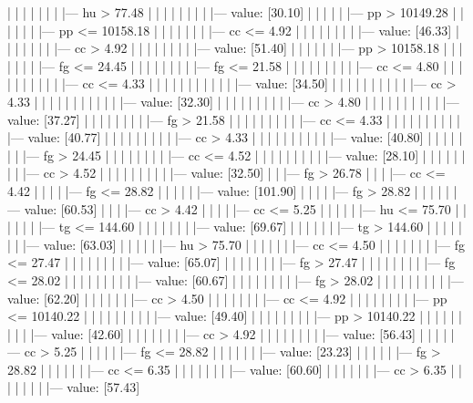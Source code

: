 \documentclass[UTF8, a4paper]{ctexart}
\begin{document}
|   |   |   |   |   |   |   |--- hu >  77.48
|   |   |   |   |   |   |   |   |--- value: [30.10]
|   |   |   |   |   |--- pp >  10149.28
|   |   |   |   |   |   |--- pp <= 10158.18
|   |   |   |   |   |   |   |--- cc <= 4.92
|   |   |   |   |   |   |   |   |--- value: [46.33]
|   |   |   |   |   |   |   |--- cc >  4.92
|   |   |   |   |   |   |   |   |--- value: [51.40]
|   |   |   |   |   |   |--- pp >  10158.18
|   |   |   |   |   |   |   |--- fg <= 24.45
|   |   |   |   |   |   |   |   |--- fg <= 21.58
|   |   |   |   |   |   |   |   |   |--- cc <= 4.80
|   |   |   |   |   |   |   |   |   |   |--- cc <= 4.33
|   |   |   |   |   |   |   |   |   |   |   |--- value: [34.50]
|   |   |   |   |   |   |   |   |   |   |--- cc >  4.33
|   |   |   |   |   |   |   |   |   |   |   |--- value: [32.30]
|   |   |   |   |   |   |   |   |   |--- cc >  4.80
|   |   |   |   |   |   |   |   |   |   |--- value: [37.27]
|   |   |   |   |   |   |   |   |--- fg >  21.58
|   |   |   |   |   |   |   |   |   |--- cc <= 4.33
|   |   |   |   |   |   |   |   |   |   |--- value: [40.77]
|   |   |   |   |   |   |   |   |   |--- cc >  4.33
|   |   |   |   |   |   |   |   |   |   |--- value: [40.80]
|   |   |   |   |   |   |   |--- fg >  24.45
|   |   |   |   |   |   |   |   |--- cc <= 4.52
|   |   |   |   |   |   |   |   |   |--- value: [28.10]
|   |   |   |   |   |   |   |   |--- cc >  4.52
|   |   |   |   |   |   |   |   |   |--- value: [32.50]
|   |   |--- fg >  26.78
|   |   |   |--- cc <= 4.42
|   |   |   |   |--- fg <= 28.82
|   |   |   |   |   |--- value: [101.90]
|   |   |   |   |--- fg >  28.82
|   |   |   |   |   |--- value: [60.53]
|   |   |   |--- cc >  4.42
|   |   |   |   |--- cc <= 5.25
|   |   |   |   |   |--- hu <= 75.70
|   |   |   |   |   |   |--- tg <= 144.60
|   |   |   |   |   |   |   |--- value: [69.67]
|   |   |   |   |   |   |--- tg >  144.60
|   |   |   |   |   |   |   |--- value: [63.03]
|   |   |   |   |   |--- hu >  75.70
|   |   |   |   |   |   |--- cc <= 4.50
|   |   |   |   |   |   |   |--- fg <= 27.47
|   |   |   |   |   |   |   |   |--- value: [65.07]
|   |   |   |   |   |   |   |--- fg >  27.47
|   |   |   |   |   |   |   |   |--- fg <= 28.02
|   |   |   |   |   |   |   |   |   |--- value: [60.67]
|   |   |   |   |   |   |   |   |--- fg >  28.02
|   |   |   |   |   |   |   |   |   |--- value: [62.20]
|   |   |   |   |   |   |--- cc >  4.50
|   |   |   |   |   |   |   |--- cc <= 4.92
|   |   |   |   |   |   |   |   |--- pp <= 10140.22
|   |   |   |   |   |   |   |   |   |--- value: [49.40]
|   |   |   |   |   |   |   |   |--- pp >  10140.22
|   |   |   |   |   |   |   |   |   |--- value: [42.60]
|   |   |   |   |   |   |   |--- cc >  4.92
|   |   |   |   |   |   |   |   |--- value: [56.43]
|   |   |   |   |--- cc >  5.25
|   |   |   |   |   |--- fg <= 28.82
|   |   |   |   |   |   |--- value: [23.23]
|   |   |   |   |   |--- fg >  28.82
|   |   |   |   |   |   |--- cc <= 6.35
|   |   |   |   |   |   |   |--- value: [60.60]
|   |   |   |   |   |   |--- cc >  6.35
|   |   |   |   |   |   |   |--- value: [57.43]
\end{document}
